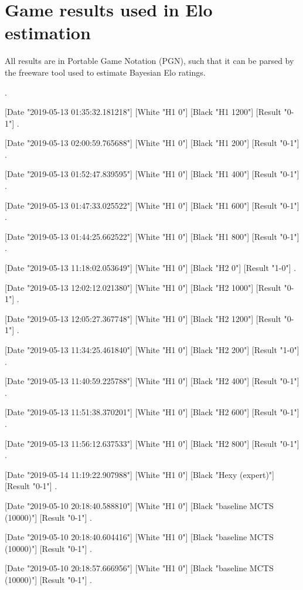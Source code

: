 \clearpage
\section{Game results used in Elo estimation}
All results are in Portable Game Notation (PGN), such that it can be parsed by the freeware tool\cite{Coulom} used to estimate Bayesian Elo ratings.

{\ttfamily
[Date "2019-05-13 01:40:16.182317"]
[White "H1 0"]
[Black "H1 1000"]
[Result "0-1"]
.

[Date "2019-05-13 01:35:32.181218"]
[White "H1 0"]
[Black "H1 1200"]
[Result "0-1"]
.

[Date "2019-05-13 02:00:59.765688"]
[White "H1 0"]
[Black "H1 200"]
[Result "0-1"]
.

[Date "2019-05-13 01:52:47.839595"]
[White "H1 0"]
[Black "H1 400"]
[Result "0-1"]
.

[Date "2019-05-13 01:47:33.025522"]
[White "H1 0"]
[Black "H1 600"]
[Result "0-1"]
.

[Date "2019-05-13 01:44:25.662522"]
[White "H1 0"]
[Black "H1 800"]
[Result "0-1"]
.

[Date "2019-05-13 11:18:02.053649"]
[White "H1 0"]
[Black "H2 0"]
[Result "1-0"]
.

[Date "2019-05-13 12:02:12.021380"]
[White "H1 0"]
[Black "H2 1000"]
[Result "0-1"]
.

[Date "2019-05-13 12:05:27.367748"]
[White "H1 0"]
[Black "H2 1200"]
[Result "0-1"]
.

[Date "2019-05-13 11:34:25.461840"]
[White "H1 0"]
[Black "H2 200"]
[Result "1-0"]
.

[Date "2019-05-13 11:40:59.225788"]
[White "H1 0"]
[Black "H2 400"]
[Result "0-1"]
.

[Date "2019-05-13 11:51:38.370201"]
[White "H1 0"]
[Black "H2 600"]
[Result "0-1"]
.

[Date "2019-05-13 11:56:12.637533"]
[White "H1 0"]
[Black "H2 800"]
[Result "0-1"]
.

[Date "2019-05-14 11:19:22.907988"]
[White "H1 0"]
[Black "Hexy (expert)"]
[Result "0-1"]
.

[Date "2019-05-10 20:18:40.588810"]
[White "H1 0"]
[Black "baseline MCTS (10000)"]
[Result "0-1"]
.

[Date "2019-05-10 20:18:40.604416"]
[White "H1 0"]
[Black "baseline MCTS (10000)"]
[Result "0-1"]
.

[Date "2019-05-10 20:18:57.666956"]
[White "H1 0"]
[Black "baseline MCTS (10000)"]
[Result "0-1"]
.

}
